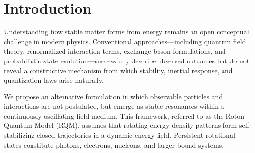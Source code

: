 \documentclass[11pt,a4paper]{article}
\begin{document}
\begin{abstract}
The RQM additionally implies that time dilation, inertial resistance, orbital locking, molecular bonding and even large-scale galactic forces all arise from differences in rotational inertia of nested resonant structures. Axial entanglement appears as distance-independent coupling—a manifestation of bitemporal resonance coherence—while spatial motion of stable entities remains inertia-limited.

Several open questions define the immediate research direction: (i) establishing quantitative scaling laws from LEDO-field parameters, (ii) deriving closed tensor formulations of resonance potentials, (iii) long-duration simulations showing the spontaneous emergence of nuclei, atoms and stable molecules from homogeneous initial conditions, and (iv) formulation of measurable predictions regarding isotope distributions, resonance-dependent orbital radii and propagation delays of rotational reorientation.

The RQM highlights that many assumptions of contemporary quantum and particle theories—singularities, renormalization, externally imposed quantization operators—emerge automatically as macroscopic consequences of resonance-stabilized dynamics rather than axioms. The model is thereby proposed as an alternative conceptual foundation for matter formation, interaction, and physical structure across scales.
\end{abstract}


\section{Introduction}
Understanding how stable matter forms from energy remains an open conceptual challenge in modern physics. Conventional approaches—including quantum field theory, renormalized interaction terms, exchange boson formulations, and probabilistic state evolution—successfully describe observed outcomes but do not reveal a constructive mechanism from which stability, inertial response, and quantization laws arise naturally.

We propose an alternative formulation in which observable particles and interactions are not postulated, but emerge as stable resonances within a continuously oscillating field medium. This framework, referred to as the Roton Quantum Model (RQM), assumes that rotating energy density patterns form self-stabilizing closed trajectories in a dynamic energy field. Persistent rotational states constitute photons, electrons, nucleons, and larger bound systems.
\end{document}
